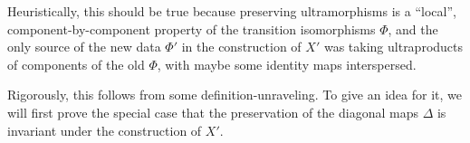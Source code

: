 Heuristically, this should be true because preserving ultramorphisms is a ``local'', component-by-component property of the transition isomorphisms $\Phi$, and the only source of the new data $\Phi'$ in the construction of $X'$ was taking ultraproducts of components of the old $\Phi$, with maybe some identity maps interspersed.

Rigorously, this follows from some definition-unraveling. To give an idea for it, we will first prove the special case that the preservation of the diagonal maps $\Delta$ is invariant under the construction of $X'$.



